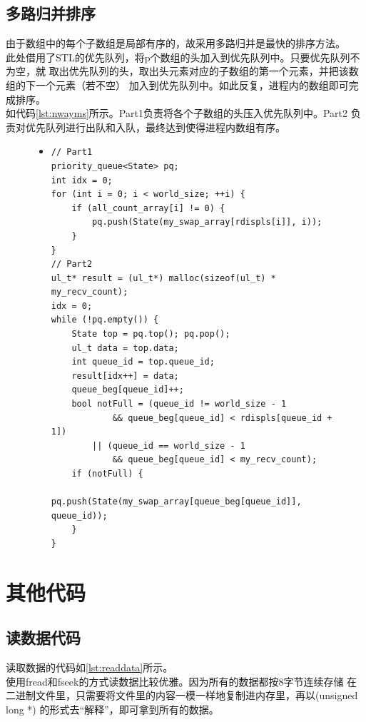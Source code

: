 \documentclass[a4paper]{article}
\begin{document}
\subsection{多路归并排序}
由于数组中的每个子数组是局部有序的，故采用多路归并是最快的排序方法。\\

此处借用了STL的优先队列，将p个数组的头加入到优先队列中。只要优先队列不为空，就
取出优先队列的头，取出头元素对应的子数组的第一个元素，并把该数组的下一个元素（若不空）
加入到优先队列中。如此反复，进程内的数组即可完成排序。 \\

如代码\autoref{lst:nwayms}所示。Part1负责将各个子数组的头压入优先队列中。Part2
负责对优先队列进行出队和入队，最终达到使得进程内数组有序。
\begin{figure}[!hbt]
\begin{itemize}
\item[] \begin{lstlisting}[style=mycpp, label=lst:nwayms, caption=多路归并排序]
// Part1
priority_queue<State> pq;
int idx = 0;
for (int i = 0; i < world_size; ++i) {
    if (all_count_array[i] != 0) {
        pq.push(State(my_swap_array[rdispls[i]], i));
    }
}
// Part2
ul_t* result = (ul_t*) malloc(sizeof(ul_t) * my_recv_count);
idx = 0;
while (!pq.empty()) {
    State top = pq.top(); pq.pop();
    ul_t data = top.data;
    int queue_id = top.queue_id;
    result[idx++] = data;
    queue_beg[queue_id]++;
    bool notFull = (queue_id != world_size - 1 
            && queue_beg[queue_id] < rdispls[queue_id + 1])
        || (queue_id == world_size - 1 
            && queue_beg[queue_id] < my_recv_count);
    if (notFull) {
        pq.push(State(my_swap_array[queue_beg[queue_id]], queue_id));
    }
}

\end{lstlisting}
\end{itemize}
\end{figure}
\section{其他代码}
\subsection{读数据代码}
读取数据的代码如\autoref{lst:readdata}所示。\\

使用fread和fseek的方式读数据比较优雅。因为所有的数据都按8字节连续存储
在二进制文件里，只需要将文件里的内容一模一样地复制进内存里，再以(unsigned long *)
的形式去``解释''，即可拿到所有的数据。\\
\end{document}
